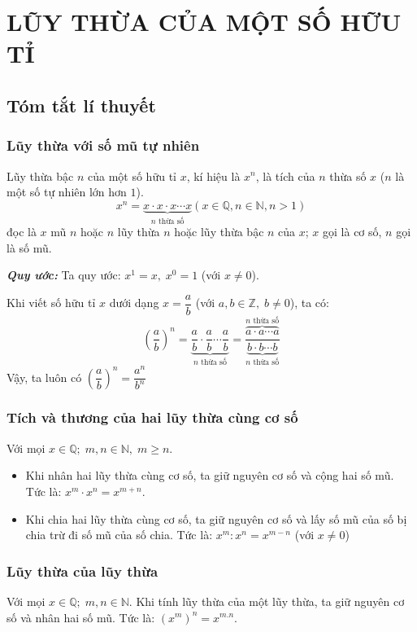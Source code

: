 
\section{LŨY THỪA CỦA MỘT SỐ HỮU TỈ}
\subsection{Tóm tắt lí thuyết}
\subsubsection{Lũy thừa với số mũ tự nhiên}
Lũy thừa bậc $n$ của một số hữu tỉ $x$, kí hiệu là $x^n$, là tích của $n$ thừa số $x$ ($n$ là một số tự nhiên lớn hơn $1$).
\[x^n = \underbrace{x\cdot x\cdot x\cdots x}_{\text{$n$ thừa số}} \left( x \in \mathbb{Q}, n \in \mathbb{N}, n > 1\right) \]
đọc là $x$ mũ $n$ hoặc $n$ lũy thừa $n$ hoặc lũy thừa bậc $n$ của $x$; $x$ gọi là cơ số, $n$ gọi là số mũ.

\textbf{\textit{Quy ước:}} Ta quy ước: $x^1 = x, \; x^0 = 1$ (với $x \ne 0$).

Khi viết số hữu tỉ $x$ dưới dạng $x = \dfrac{a}{b}$ (với $a, b \in \mathbb{Z}, \; b \ne 0$), ta có:
\[\left( \dfrac{a}{b}\right) ^n = \underbrace{\dfrac{a}{b}\cdot \dfrac{a}{b}\cdots\dfrac{a}{b}}_{\text{$n$ thừa số}} = \dfrac{\overbrace{a\cdot a\cdots a}^{\text{$n$ thừa số}}}{\underbrace{b\cdot b\cdots b}_{\text{$n$ thừa số}}} \]
Vậy, ta luôn có $\left( \dfrac{a}{b}\right) ^n = \dfrac{a^n}{b^n}$

\subsubsection{Tích và thương của hai lũy thừa cùng cơ số}
Với mọi $x \in \mathbb{Q}; \; m, n \in \mathbb{N}, \; m \ge n$.
\begin{itemize}
	\item Khi nhân hai lũy thừa cùng cơ số, ta giữ nguyên cơ số và cộng hai số mũ. Tức là: $x^m\cdot  x^n = x^{m+n}$.
	\item Khi chia hai lũy thừa cùng cơ số, ta giữ nguyên cơ số và lấy số mũ của số bị chia trừ đi số mũ của số chia. Tức là: $x^m:x^n = x^{m - n}$ (với $x \ne 0$)
\end{itemize}

\subsubsection{Lũy thừa của lũy thừa}
Với mọi $x \in \mathbb{Q}; \; m, n \in \mathbb{N}$. Khi tính lũy thừa của một lũy thừa, ta giữ nguyên cơ số và nhân hai số mũ. Tức là: $\left( x^m\right) ^n = x^{m.n}$.
